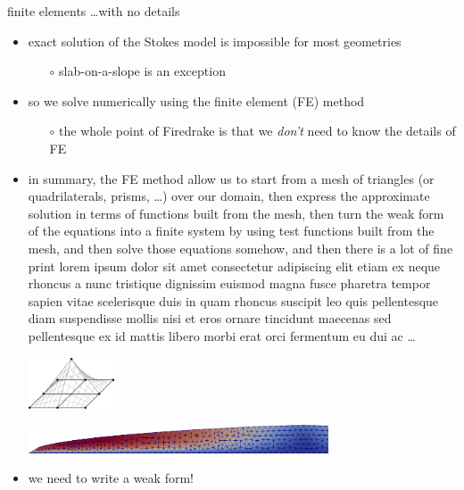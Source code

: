 \documentclass[10pt,hyperref,dvipsnames]{beamer}
\begin{document}
\begin{frame}{finite elements \dots with no details}

\begin{itemize}
\item exact solution of the Stokes model is impossible for most geometries
    \begin{itemize}
    \item[$\circ$] slab-on-a-slope is an exception
    \end{itemize}
\item so we solve numerically using the finite element (FE) method
    \begin{itemize}
    \item[$\circ$] \alert{the whole point of Firedrake is that we \emph{don't} need to know the details of FE}
    \end{itemize}
\item in summary, the FE method allow us to start from a mesh of triangles {\small (or quadrilaterals, prisms, \dots) over our domain, {\footnotesize then express the approximate solution in terms of functions built from the mesh, {\scriptsize then turn the \alert{weak form} of the equations into a finite system by using test functions built from the mesh, {\tiny and then solve those equations somehow, and then there is a lot of fine print lorem ipsum dolor sit amet consectetur adipiscing elit etiam ex neque rhoncus a nunc tristique dignissim euismod magna fusce pharetra tempor sapien vitae scelerisque duis in quam rhoncus suscipit leo quis pellentesque diam suspendisse mollis nisi et eros ornare tincidunt maecenas sed pellentesque ex id mattis libero morbi erat orci fermentum eu dui ac \dots}}}}

\medskip
\includegraphics[width=0.2\textwidth]{figs/hat.png} \hfill

\vspace{-9mm}
\hfill \includegraphics[width=0.7\textwidth]{figs/stage2.png}

\bigskip
\item we need to write a \alert{weak form}!
\end{itemize}
\end{frame}
\end{document}
